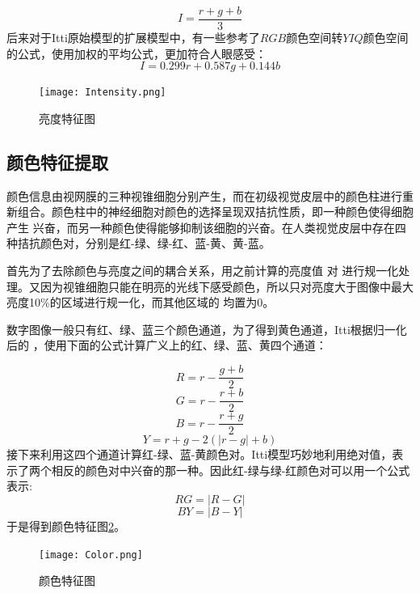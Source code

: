 \documentclass[a4paper,12pt]{article}
\begin{document}
\begin{equation}
I=\frac{r+g+b}{3}
\end{equation}
后来对于Itti原始模型的扩展模型中，有一些参考了$RGB$颜色空间转$YIQ$颜色空间的公式，使用加权的平均公式，更加符合人眼感受：
\begin{equation}
I=0.299r+0.587g+0.144b
\end{equation}

\begin{figure}[!htb]
\centering
\texttt{[image: Intensity.png]}
\caption{亮度特征图}\label{fig:2} 
\end{figure}

\subsection{颜色特征提取}

颜色信息由视网膜的三种视锥细胞分别产生，而在初级视觉皮层中的颜色柱进行重新组合。颜色柱中的神经细胞对颜色的选择呈现双拮抗性质，即一种颜色使得细胞产生
兴奋，而另一种颜色使得能够抑制该细胞的兴奋。在人类视觉皮层中存在四种拮抗颜色对，分别是红-绿、绿-红、蓝-黄、黄-蓝。


首先为了去除颜色与亮度之间的耦合关系，用之前计算的亮度值 对 进行规一化处理。又因为视锥细胞只能在明亮的光线下感受颜色，所以只对亮度大于图像中最大亮度10\%的区域进行规一化，而其他区域的 均置为$0$。



数字图像一般只有红、绿、蓝三个颜色通道，为了得到黄色通道，Itti根据归一化后的 ，使用下面的公式计算广义上的红、绿、蓝、黄四个通道：

\begin{equation}
R=r-\frac{g+b}{2}
\end{equation}
\begin{equation}
G=r-\frac{r+b}{2}
\end{equation}
\begin{equation}
B=r-\frac{r+g}{2}
\end{equation}
\begin{equation}
Y=r+g-2(|r-g|+b)
\end{equation}
接下来利用这四个通道计算红-绿、蓝-黄颜色对。Itti模型巧妙地利用绝对值，表示了两个相反的颜色对中兴奋的那一种。因此红-绿与绿-红颜色对可以用一个公式表示:
\begin{equation}
RG=|R-G|
\end{equation}
\begin{equation}
BY=|B-Y|
\end{equation}
于是得到颜色特征图\ref{fig:3}。
\begin{figure}[!htb]
\centering
\texttt{[image: Color.png]}
\caption{颜色特征图}\label{fig:3} 
\end{figure}
\end{document}
